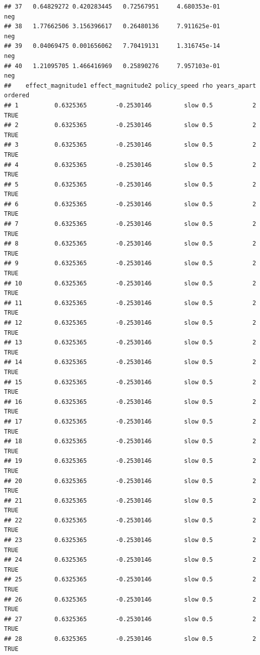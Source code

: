 \documentclass[
]{article}
\begin{document}
\begin{verbatim}
## 37   0.64829272 0.420283445   0.72567951     4.680353e-01              neg
## 38   1.77662506 3.156396617   0.26480136     7.911625e-01              neg
## 39   0.04069475 0.001656062   7.70419131     1.316745e-14              neg
## 40   1.21095705 1.466416969   0.25890276     7.957103e-01              neg
##    effect_magnitude1 effect_magnitude2 policy_speed rho years_apart ordered
## 1          0.6325365        -0.2530146         slow 0.5           2    TRUE
## 2          0.6325365        -0.2530146         slow 0.5           2    TRUE
## 3          0.6325365        -0.2530146         slow 0.5           2    TRUE
## 4          0.6325365        -0.2530146         slow 0.5           2    TRUE
## 5          0.6325365        -0.2530146         slow 0.5           2    TRUE
## 6          0.6325365        -0.2530146         slow 0.5           2    TRUE
## 7          0.6325365        -0.2530146         slow 0.5           2    TRUE
## 8          0.6325365        -0.2530146         slow 0.5           2    TRUE
## 9          0.6325365        -0.2530146         slow 0.5           2    TRUE
## 10         0.6325365        -0.2530146         slow 0.5           2    TRUE
## 11         0.6325365        -0.2530146         slow 0.5           2    TRUE
## 12         0.6325365        -0.2530146         slow 0.5           2    TRUE
## 13         0.6325365        -0.2530146         slow 0.5           2    TRUE
## 14         0.6325365        -0.2530146         slow 0.5           2    TRUE
## 15         0.6325365        -0.2530146         slow 0.5           2    TRUE
## 16         0.6325365        -0.2530146         slow 0.5           2    TRUE
## 17         0.6325365        -0.2530146         slow 0.5           2    TRUE
## 18         0.6325365        -0.2530146         slow 0.5           2    TRUE
## 19         0.6325365        -0.2530146         slow 0.5           2    TRUE
## 20         0.6325365        -0.2530146         slow 0.5           2    TRUE
## 21         0.6325365        -0.2530146         slow 0.5           2    TRUE
## 22         0.6325365        -0.2530146         slow 0.5           2    TRUE
## 23         0.6325365        -0.2530146         slow 0.5           2    TRUE
## 24         0.6325365        -0.2530146         slow 0.5           2    TRUE
## 25         0.6325365        -0.2530146         slow 0.5           2    TRUE
## 26         0.6325365        -0.2530146         slow 0.5           2    TRUE
## 27         0.6325365        -0.2530146         slow 0.5           2    TRUE
## 28         0.6325365        -0.2530146         slow 0.5           2    TRUE

\end{verbatim}
\end{document}
